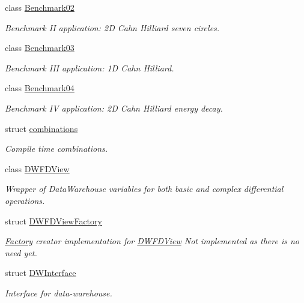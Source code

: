 \begin{DoxyCompactItemize}
class \hyperlink{classUintah_1_1PhaseField_1_1Benchmark02}{Benchmark02}
\begin{DoxyCompactList}\small\item\em Benchmark II application\+: 2D Cahn Hilliard seven circles. \end{DoxyCompactList}\item 
class \hyperlink{classUintah_1_1PhaseField_1_1Benchmark03}{Benchmark03}
\begin{DoxyCompactList}\small\item\em Benchmark I\+II application\+: 1D Cahn Hilliard. \end{DoxyCompactList}\item 
class \hyperlink{classUintah_1_1PhaseField_1_1Benchmark04}{Benchmark04}
\begin{DoxyCompactList}\small\item\em Benchmark IV application\+: 2D Cahn Hilliard energy decay. \end{DoxyCompactList}\item 
struct \hyperlink{structUintah_1_1PhaseField_1_1combinations}{combinations}
\begin{DoxyCompactList}\small\item\em Compile time combinations. \end{DoxyCompactList}\item 
class \hyperlink{classUintah_1_1PhaseField_1_1DWFDView}{D\+W\+F\+D\+View}
\begin{DoxyCompactList}\small\item\em Wrapper of Data\+Warehouse variables for both basic and complex differential operations. \end{DoxyCompactList}\item 
struct \hyperlink{structUintah_1_1PhaseField_1_1DWFDViewFactory}{D\+W\+F\+D\+View\+Factory}
\begin{DoxyCompactList}\small\item\em \hyperlink{classUintah_1_1PhaseField_1_1Factory}{Factory} creator implementation for \hyperlink{classUintah_1_1PhaseField_1_1DWFDView}{D\+W\+F\+D\+View} Not implemented as there is no need yet. \end{DoxyCompactList}\item 
struct \hyperlink{structUintah_1_1PhaseField_1_1DWInterface}{D\+W\+Interface}
\begin{DoxyCompactList}\small\item\em Interface for data-\/warehouse. \end{DoxyCompactList}\item 

\end{DoxyCompactItemize}
